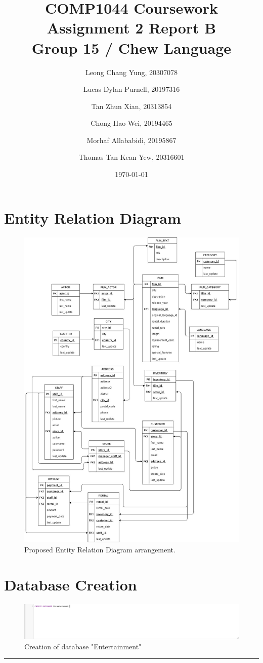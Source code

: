 \documentclass{article}
\title{\textbf{COMP1044 Coursework Assignment 2 Report B} \\ Group 15 / Chew Language}
\author{
	Leong Chang Yung, 20307078
	\and
	Lucas Dylan Purnell, 20197316
	\and
	Tan Zhun Xian, 20313854
	\and
	Chong Hao Wei, 20194465
	\and
	Morhaf Allababidi, 20195867
	\and
	Thomas Tan Kean Yew, 20316601
}
\date{\today}
\begin{document}
\maketitle
\newpage

\section{Entity Relation Diagram}
	\begin{figure}[h!]
		\includegraphics[height=.8\textheight, width=\textwidth]{er_diagram}
		\caption{Proposed Entity Relation Diagram arrangement. \protect\footnotemark}	
	\end{figure}


\section{Database Creation}
	\begin{figure}[H]
		\includegraphics[width=\textwidth]{database_create}
		\caption{Creation of database "Entertainment"}	
	\end{figure}
	\rule{\textwidth}{0.4pt}
\end{document}
